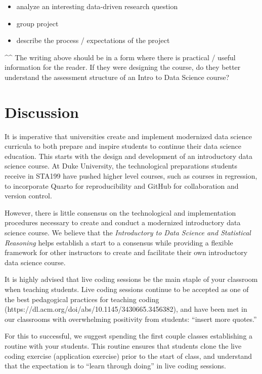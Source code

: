 \documentclass[
  12pt]{article}
\begin{document}
\begin{itemize}
\item
  analyze an interesting data-driven research question
\item
  group project
\item
  describe the process / expectations of the project
\end{itemize}

\^{}\^{} The writing above should be in a form where there is practical
/ useful information for the reader. If they were designing the course,
do they better understand the assessment structure of an Intro to Data
Science course?

\hypertarget{discussion}{%
\section{Discussion}\label{discussion}}

It is imperative that universities create and implement modernized data
science curricula to both prepare and inspire students to continue their
data science education. This starts with the design and development of
an introductory data science course. At Duke University, the
technological preparations students receive in STA199 have pushed higher
level courses, such as courses in regression, to incorporate Quarto for
reproducibility and GitHub for collaboration and version control.

However, there is little consensus on the technological and
implementation procedures necessary to create and conduct a modernized
introductory data science course. We believe that the \emph{Introductory
to Data Science and Statistical Reasoning} helps establish a start to a
consensus while providing a flexible framework for other instructors to
create and facilitate their own introductory data science course.

It is highly advised that live coding sessions be the main staple of
your classroom when teaching students. Live coding sessions continue to
be accepted as one of the best pedagogical practices for teaching coding
(https://dl.acm.org/doi/abs/10.1145/3430665.3456382), and have been met
in our classrooms with overwhelming positivity from students: ``insert
more quotes.''

For this to successful, we suggest spending the first couple classes
establishing a routine with your students. This routine ensures that
students clone the live coding exercise (application exercise) prior to
the start of class, and understand that the expectation is to ``learn
through doing'' in live coding sessions.
\end{document}
